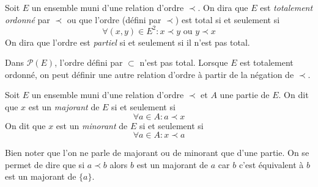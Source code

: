 \begin{defi}
 Soit $E$ un ensemble muni d'une relation d'ordre $\prec$. On dira que $E$ est \emph{totalement ordonné} par $\prec$ ou que l'ordre (défini par $\prec$) est total si et seulement si 
\begin{displaymath}
 \forall (x,y)\in E^2 : x \prec y \text{ ou } y \prec x
\end{displaymath}
On dira que l'ordre est \emph{partiel} si et seulement si il n'est pas total.
\end{defi}
\begin{exples}
 Dans $\mathcal P(E)$, l'ordre défini par $\subset$ n'est pas total. Lorsque $E$ est totalement ordonné, on peut définir une autre relation d'ordre à partir de la négation de $\prec$.
\end{exples}

 
\begin{defi}
  Soit $E$ un ensemble muni d'une relation d'ordre $\prec$ et $A$ une partie de $E$.\newline
On dit que $x$ est un \emph{majorant} de $E$ si et seulement si 
\begin{displaymath}
 \forall a\in A : a \prec x
\end{displaymath}
On dit que $x$ est un \emph{minorant} de $E$ si et seulement si 
\begin{displaymath}
 \forall a\in A : x \prec a
\end{displaymath}
\end{defi}
\begin{rem}
 Bien noter que l'on ne parle de majorant ou de minorant que d'une partie. On se permet de dire que si $a \prec b$ alors $b$ est un majorant de $a$ car $b$ c'est équivalent à $b$ est un majorant de $\{a\}$.
\end{rem}


